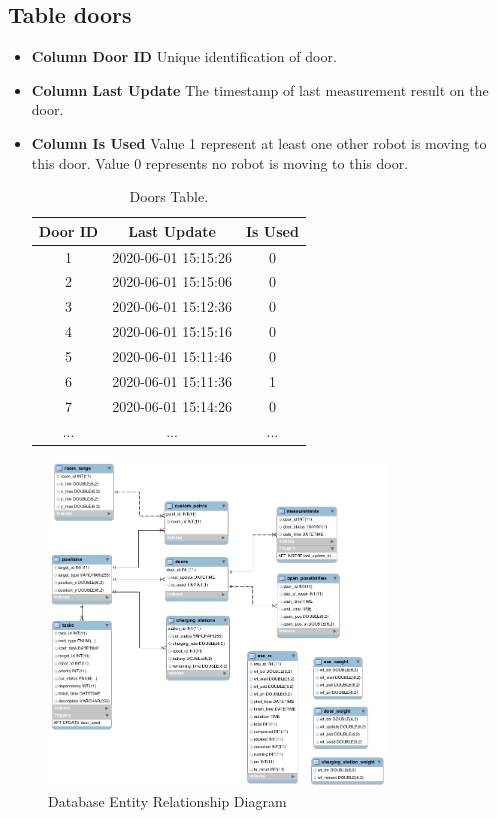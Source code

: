 \subsection*{Table doors}
\begin{itemize}
    \item \textbf{Column Door ID} Unique identification of door.
    \item \textbf{Column Last Update} The timestamp of last measurement result on the door.
    \item \textbf{Column Is Used} Value 1 represent at least one other robot is moving to this door. Value 0 represents no robot is moving to this door.
    \begin{table}[htb]
    \centering
    \begin{tabular}{|c|c|c|} 
    \hline
    Door ID & Last Update & Is Used \\ \hline
    1 & 2020-06-01 15:15:26 & 0 \\ \hline
    2 & 2020-06-01 15:15:06 & 0 \\ \hline
    3 & 2020-06-01 15:12:36 & 0 \\ \hline
    4 & 2020-06-01 15:15:16 & 0 \\ \hline
    5 & 2020-06-01 15:11:46 & 0 \\ \hline
    6 & 2020-06-01 15:11:36 & 1 \\ \hline
    7 & 2020-06-01 15:14:26 & 0 \\ \hline
    ...& ...& ... \\ \hline
    \end{tabular}
    \caption{Doors Table.}
    \label{tab:db_doors}
    \end{table}
\end{itemize}


\begin{figure}[htbp]
    \centering
    \includegraphics[width = 0.8\textwidth]{content/images/ch4/database_er.png}
    \caption{Database Entity Relationship Diagram}
    \label{fig:database_er}
    \end{figure}    

